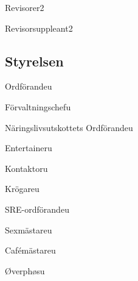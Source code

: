 \documentclass[10pt]{article}
\begin{document}
\begin{vallista}
    \begin{post}{Revisorer}{2}
        \vakant
    \end{post}
    \begin{post}{Revisorsuppleant}{2}
        \vakant
        \vakant
    \end{post}
\end{vallista}

\subsection{Styrelsen}

\begin{vallista}
    \begin{post}{Ordförande}{u}
    \end{post}
    \begin{post}{Förvaltningschef}{u}
    \end{post}
    \begin{post}{Näringslivsutskottets Ordförande}{u}
    \end{post}
    \begin{post}{Entertainer}{u}
    \end{post}
    \begin{post}{Kontaktor}{u}
    \end{post}
    \begin{post}{Krögare}{u}
    \end{post}
    \begin{post}{SRE-ordförande}{u}
    \end{post}
    \begin{post}{Sexmästare}{u}
    \end{post}
    \begin{post}{Cafémästare}{u}
    \end{post}
    \begin{post}{Øverphøs}{u}
    \end{post}
\end{vallista}
\end{document}
